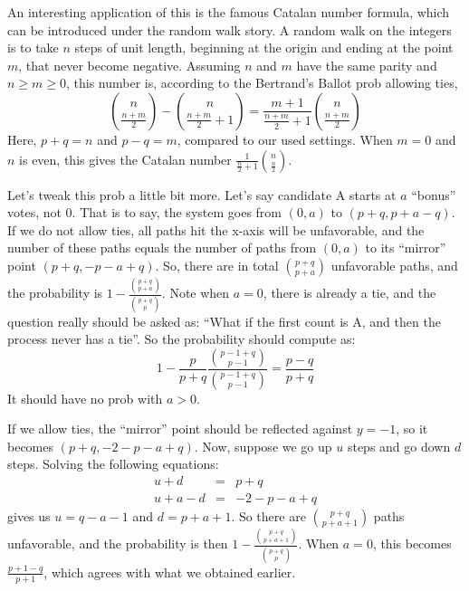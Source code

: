 
An interesting application of this is the famous Catalan number formula, which can be introduced under the random walk story. A random walk on the integers is to take $n$ steps of unit length, beginning at the origin and ending at the point $m$, that never become negative. Assuming $n$ and $m$ have the same parity and $n \ge m \ge 0$, this number is, according to the Bertrand's Ballot prob allowing ties,
\begin{equation*}
	{n \choose \frac{n+m}{2}} - {n \choose \frac{n+m}{2}+1} = \frac{m+1}{\frac{n+m}{2}+1} {n \choose \frac{n+m}{2}}
\end{equation*}
Here, $p+q=n$ and $p-q=m$, compared to our used settings. When $m=0$ and $n$ is even, this gives the Catalan number $\frac{1}{\frac{n}{2}+1} {n \choose \frac{n}{2}}$.

Let's tweak this prob a little bit more. Let's say candidate A starts at $a$ ``bonus'' votes, not 0. That is to say, the system goes from $(0,a)$ to $(p+q,p+a-q)$. If we do not allow ties, all paths hit the x-axis will be unfavorable, and the number of these paths equals the number of paths from $(0,a)$ to its ``mirror'' point $(p+q,-p-a+q)$. So, there are in total ${p+q \choose p+a}$ unfavorable paths, and the probability is $1 - \frac{{p+q \choose p+a}}{{p+q \choose p}}$. Note when $a=0$, there is already a tie, and the question really should be asked as: ``What if the first count is A, and then the process never has a tie''. So the probability should compute as:
\begin{equation*}
	1 - \frac{p}{p+q} \frac{{p-1+q \choose p-1}}{{p-1+q \choose p-1}} = \frac{p-q}{p+q}
\end{equation*}
It should have no prob with $a>0$.

If we allow ties, the ``mirror'' point should be reflected against $y=-1$, so it becomes $(p+q,-2-p-a+q)$. Now, suppose we go up $u$ steps and go down $d$ steps. Solving the following equations:
\begin{eqnarray*}
	u+d & = & p+q\\
	u+a-d & = & -2-p-a+q
\end{eqnarray*}
gives us $u=q-a-1$ and $d=p+a+1$. So there are ${p+q \choose p+a+1}$ paths unfavorable, and the probability is then $1-\frac{{p+q \choose p+a+1}}{{p+q \choose p}}$. When $a=0$, this becomes $\frac{p+1-q}{p+1}$, which agrees with what we obtained earlier.


